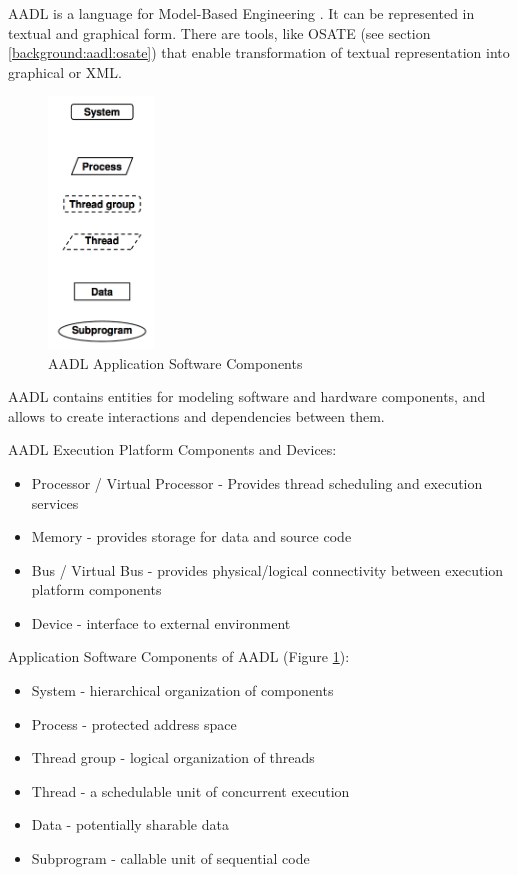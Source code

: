 AADL is a language for Model-Based Engineering \cite{AadlBook}. It can be represented in textual and graphical form. There are tools, like OSATE (see section \ref{background:aadl:osate}) that enable transformation of textual representation into graphical or XML. 

\begin{figure}
  \begin{center}
    \includegraphics[width=0.25\textwidth]{figures/aadl-app-components.png}
  \end{center}
  \caption{AADL Application Software Components}
  \label{figure:aadl_app_software_components}
\end{figure}

AADL contains entities for modeling software and hardware components, and allows to create interactions and dependencies between them.

AADL Execution Platform Components and Devices:
\begin{itemize}
	\item Processor / Virtual Processor - Provides thread scheduling and execution services
	\item Memory - provides storage for data and source code
	\item Bus / Virtual Bus - provides physical/logical connectivity between execution platform components
	\item Device - interface to external environment
\end{itemize}

Application Software Components of AADL (Figure \ref{figure:aadl_app_software_components}):
\begin{itemize}
	\item System - hierarchical organization of components
	\item Process - protected address space
	\item Thread group - logical organization of threads
	\item Thread - a schedulable unit of concurrent execution
	\item Data - potentially sharable data
	\item Subprogram - callable unit of sequential code
\end{itemize}

